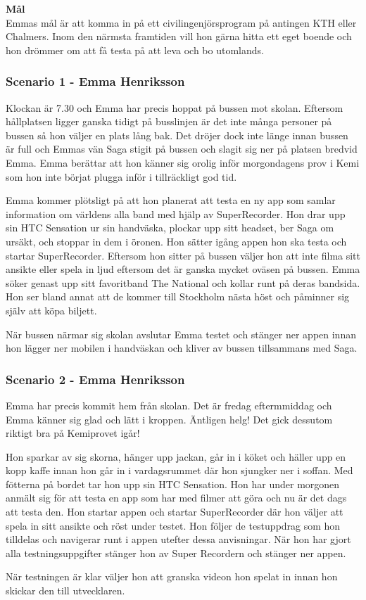 \textbf{Mål}\\
Emmas mål är att komma in på ett civilingenjörsprogram på antingen KTH eller Chalmers. Inom den närmsta framtiden vill hon gärna hitta ett eget boende och hon drömmer om att få testa på att leva och bo utomlands.

\newpage

\subsubsection{Scenario 1 - Emma Henriksson}
Klockan är 7.30 och Emma har precis hoppat på bussen mot skolan. Eftersom hållplatsen ligger ganska tidigt på busslinjen är det inte många personer på bussen så hon väljer en plats lång bak. Det dröjer dock inte länge innan bussen är full och Emmas vän Saga stigit på bussen och slagit sig ner på platsen bredvid Emma. Emma berättar att hon känner sig orolig inför morgondagens prov i Kemi som hon inte börjat plugga inför i tillräckligt god tid.

Emma kommer plötsligt på att hon planerat att testa en ny app som samlar information om världens alla band med hjälp av SuperRecorder. Hon drar upp sin HTC Sensation ur sin handväska, plockar upp sitt headset, ber Saga om ursäkt, och stoppar in dem i öronen. Hon sätter igång appen hon ska testa och startar SuperRecorder. Eftersom hon sitter på bussen väljer hon att inte filma sitt ansikte eller spela in ljud eftersom det är ganska mycket oväsen på bussen. Emma söker genast upp sitt favoritband The National och kollar runt på deras bandsida. Hon ser bland annat att de kommer till Stockholm nästa höst och påminner sig själv att köpa biljett.

När bussen närmar sig skolan avslutar Emma testet och stänger ner appen innan hon lägger ner mobilen i handväskan och kliver av bussen tillsammans med Saga.

\subsubsection{Scenario 2 - Emma Henriksson}
Emma har precis kommit hem från skolan. Det är fredag eftermmiddag och Emma känner sig glad och lätt i kroppen. Äntligen helg! Det gick dessutom riktigt bra på Kemiprovet igår!

Hon sparkar av sig skorna, hänger upp jackan, går in i köket och häller upp en kopp kaffe innan hon går in i vardagsrummet där hon sjungker ner i soffan. Med fötterna på bordet tar hon upp sin HTC Sensation. Hon har under morgonen anmält sig för att testa en app som har med filmer att göra och nu är det dags att testa den. Hon startar appen och startar SuperRecorder där hon väljer att spela in sitt ansikte och röst under testet. Hon följer de testuppdrag som hon tilldelas och navigerar runt i appen utefter dessa anvisningar. När hon har gjort alla testningsuppgifter stänger hon av Super Recordern och stänger ner appen.

När testningen är klar väljer hon att granska videon hon spelat in innan hon skickar den till utvecklaren.
